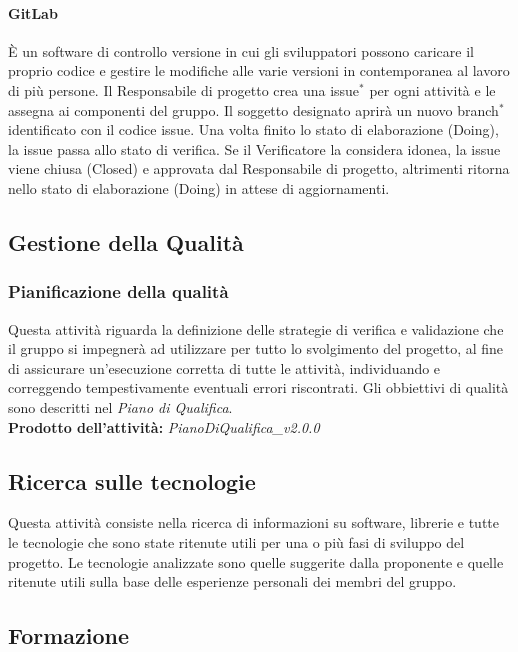 \documentclass[11pt,a4paper]{article}
\begin{document}
{	\paragraph{GitLab\\}
	È un software di controllo versione in cui gli sviluppatori possono caricare il proprio codice e gestire le modifiche alle varie versioni in contemporanea al lavoro di più persone.
	Il Responsabile di progetto crea una issue$^*$ per ogni attività e le assegna ai componenti del gruppo. Il soggetto designato aprirà un nuovo branch$^*$ identificato con il codice issue.
	Una volta finito lo stato di elaborazione (Doing), la issue passa allo stato di verifica. Se il Verificatore la considera idonea, la issue viene chiusa (Closed) e approvata dal Responsabile di progetto, altrimenti ritorna nello stato di elaborazione (Doing) in attese di aggiornamenti.
	
	\subsection{Gestione della Qualità}
	\subsubsection{Pianificazione della qualità}
	Questa attività riguarda la definizione delle strategie di verifica e validazione che il gruppo si impegnerà ad utilizzare per tutto lo svolgimento del progetto, al fine di assicurare un'esecuzione corretta di tutte le attività, individuando e correggendo tempestivamente eventuali errori riscontrati. Gli obbiettivi di qualità sono descritti nel \textit{Piano di Qualifica}.\\
	\textbf{Prodotto dell'attività:} \textit{PianoDiQualifica\_v2.0.0}
	
	\subsection{Ricerca sulle tecnologie} 
	Questa attività consiste nella ricerca di informazioni su software, librerie e tutte le tecnologie che sono state ritenute utili per una o più fasi di sviluppo del progetto. Le tecnologie analizzate  sono quelle suggerite dalla proponente e quelle ritenute utili sulla base delle esperienze personali dei membri del gruppo.
	
	\subsection{Formazione}
}
\end{document}
